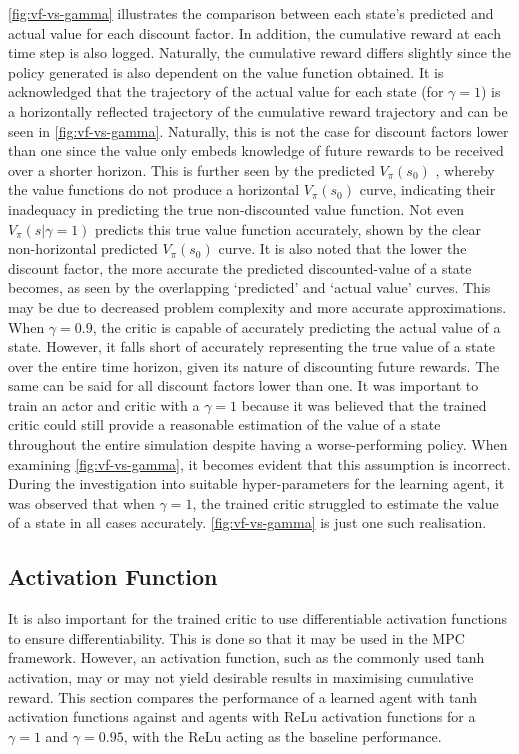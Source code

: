 \autoref{fig:vf-vs-gamma}  illustrates the comparison between each state's predicted and actual value for each discount factor. In addition, the cumulative reward at each time step is also logged. Naturally, the cumulative reward differs slightly since the policy generated is also dependent on the value function obtained. It is acknowledged that the trajectory of the actual value for each state (for $\gamma = 1$)  is a horizontally reflected trajectory of the cumulative reward trajectory and can be seen in \autoref{fig:vf-vs-gamma}. Naturally, this is not the case for discount factors lower than one since the value only embeds knowledge of future rewards to be received over a shorter horizon. This is further seen by the predicted $V_{\pi}(s_0)$ , whereby the value functions do not produce a horizontal $V_{\pi}(s_0)$ curve, indicating their inadequacy in predicting the true non-discounted value function. Not even $V_{\pi}(s|\gamma = 1)$ predicts this true value function accurately, shown by the clear non-horizontal predicted $V_{\pi}(s_0)$ curve. It is also noted that the lower the discount factor, the more accurate the predicted discounted-value of a state becomes, as seen by the overlapping ‘predicted’ and ‘actual value’ curves. This may be due to decreased problem complexity and more accurate approximations. When $\gamma = 0.9$, the critic is capable of accurately predicting the actual value of a state. However, it falls short of accurately representing the true value of a state over the entire time horizon, given its nature of discounting future rewards. The same can be said for all discount factors lower than one. It was important to train an actor and critic with a $\gamma = 1$ because it was believed that the trained critic could still provide a reasonable estimation of the value of a state throughout the entire simulation despite having a worse-performing policy. When examining \autoref{fig:vf-vs-gamma}, it becomes evident that this assumption is incorrect. During the investigation into suitable hyper-parameters for the learning agent, it was observed that when $\gamma = 1$, the trained critic struggled to estimate the value of a state in all cases accurately. \autoref{fig:vf-vs-gamma} is just one such realisation.

\subsection{Activation Function}\label{ssection:act-fn}
It is also important for the trained critic to use differentiable activation functions to ensure differentiability. This is done so that it may be used in the MPC framework. However, an activation function, such as the commonly used tanh activation, may or may not yield desirable results in maximising cumulative reward. This section compares the performance of a learned agent with tanh activation functions against and agents with ReLu activation functions for a $\gamma = 1$ and $\gamma = 0.95$, with the ReLu acting as the baseline performance.



